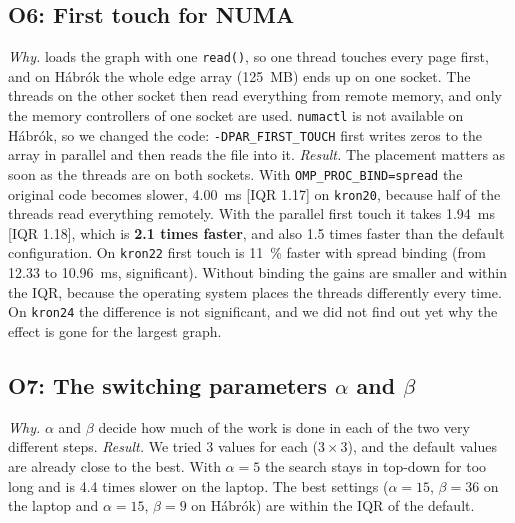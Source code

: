 \subsection{O6: First touch for NUMA}
\emph{Why.} \gapbs{} loads the graph with one \texttt{read()}, so one thread touches every page
first, and on Hábrók the whole edge array (\SI{125}{MB}) ends up on one socket. The threads on
the other socket then read everything from remote memory, and only the memory controllers of
one socket are used. \texttt{numactl} is not available on Hábrók, so we changed the code:
\texttt{-DPAR\_FIRST\_TOUCH} first writes zeros to the array in parallel and then reads the
file into it. \emph{Result.} The placement matters as soon as the threads are on both
sockets. With \texttt{OMP\_PROC\_BIND=spread} the original code becomes slower, \SI{4.00}{ms}
[IQR 1.17] on \texttt{kron20}, because half of the threads read everything remotely. With the
parallel first touch it takes \SI{1.94}{ms} [IQR 1.18], which is \textbf{2.1 times faster}, and
also 1.5 times faster than the default configuration. On \texttt{kron22} first touch is
\SI{11}{\percent} faster with spread binding (from 12.33 to \SI{10.96}{ms}, significant).
Without binding the gains are smaller and within the IQR, because the operating system places
the threads differently every time. On \texttt{kron24} the difference is not significant, and
we did not find out yet why the effect is gone for the largest graph.

\subsection{O7: The switching parameters $\alpha$ and $\beta$}
\emph{Why.} $\alpha$ and $\beta$ decide how much of the work is done in each of the two very
different steps. \emph{Result.} We tried 3 values for each ($3 \times 3$), and the default values
are already close to the best. With $\alpha = 5$ the search stays in top-down for too long and
is 4.4 times slower on the laptop. The best settings ($\alpha = 15$, $\beta = 36$ on the laptop
and $\alpha = 15$, $\beta = 9$ on Hábrók) are within the IQR of the default.
